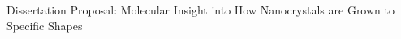 Dissertation Proposal: Molecular Insight into How Nanocrystals are Grown to Specific Shapes
    
    